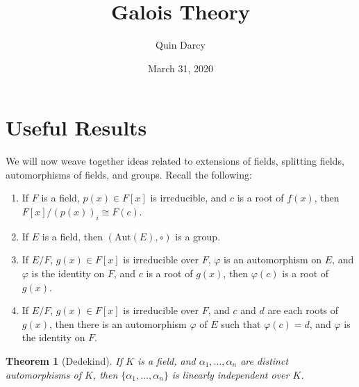 \documentclass{article}
\newtheorem{theorem}{Theorem}
\theoremstyle{definition}
\theoremstyle{remark}
\theoremstyle{definition}
\begin{document}
\title{Galois Theory}
\author{Quin Darcy}
\date{March 31, 2020}
\maketitle

\section{Useful Results}
    We will now weave together ideas related to extensions of fields, splitting fields, automorphisms of fields, and groups. Recall the following:
        \begin{enumerate}
            \item If $F$ is a field, $p(x)\in F[x]$ is irreducible, and $c$ is a root of $f(x)$, then $F[x]/(p(x))_i\cong F(c)$.
            \item If $E$ is a field, then $(\text{Aut}(E),\circ)$ is a group. 
            \item If $E/F$, $g(x)\in F[x]$ is irreducible over $F$, $\varphi$ is an automorphism on $E$, and $\varphi$ is the identity on $F$, and $c$ is a root of $g(x)$, then $\varphi(c)$ is a root of $g(x)$.
            \item If $E/F$, $g(x)\in F[x]$ is irreducible over $F$, and $c$ and $d$ are each roots of $g(x)$, then there is an automorphism $\varphi$ of $E$ such that $\varphi(c)=d$, and $\varphi$ is the identity on $F$.
        \end{enumerate}
    \begin{theorem}[Dedekind]
        If $K$ is a field, and $\alpha_1,\dots,\alpha_n$ are distinct automorphisms of $K$, then $\{\alpha_1,\dots,\alpha_n\}$ is linearly independent over $K$.
    \end{theorem}
\end{document}
